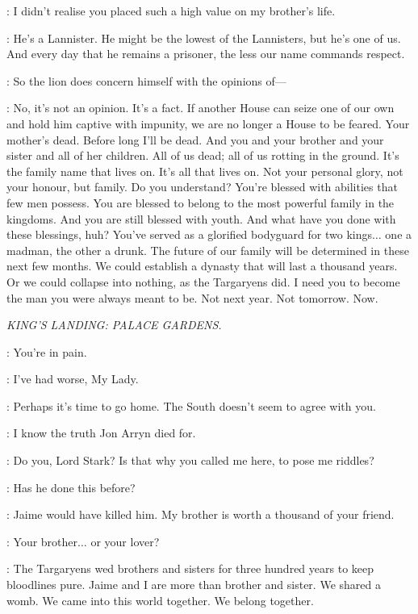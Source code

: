 \JAIME: I didn't realise you placed such a high value on my brother's life. 

\TYWIN: He's a Lannister. He might be the lowest of the Lannisters, but he's one of us. And every day that he remains a prisoner, the less our name commands respect. 

\JAIME: So the lion does concern himself with the opinions of--- 

\TYWIN: No, it's not an opinion. It's a fact. If another House can seize one of our own and hold him captive with impunity, we are no longer a House to be feared. Your mother's dead. Before long I'll be dead. And you and your brother and your sister and all of her children. All of us dead; all of us rotting in the ground. It's the family name that lives on. It's all that lives on. Not your personal glory, not your honour, but family. Do you understand? You're blessed with abilities that few men possess. You are blessed to belong to the most powerful family in the kingdoms. And you are still blessed with youth. And what have you done with these blessings, huh? You've served as a glorified bodyguard for two kings$\ldots$ one a madman, the other a drunk. The future of our family will be determined in these next few months. We could establish a dynasty that will last a thousand years. Or we could collapse into nothing, as the Targaryens did. I need you to become the man you were always meant to be. Not next year. Not tomorrow. Now. 


\scene

\textit{ KING'S LANDING: PALACE GARDENS.}


\CERSEI: You're in pain. 

\NED: I've had worse, My Lady. 

\CERSEI: Perhaps it's time to go home. The South doesn't seem to agree with you. 

\NED: I know the truth Jon Arryn died for. 

\CERSEI: Do you, Lord Stark? Is that why you called me here, to pose me riddles? 

\NED:  Has he done this before? 

\CERSEI: Jaime would have killed him. My brother is worth a thousand of your friend. 

\NED: Your brother$\ldots$ or your lover? 

\CERSEI: The Targaryens wed brothers and sisters for three hundred years to keep bloodlines pure. Jaime and I are more than brother and sister. We shared a womb. We came into this world together. We belong together. 

